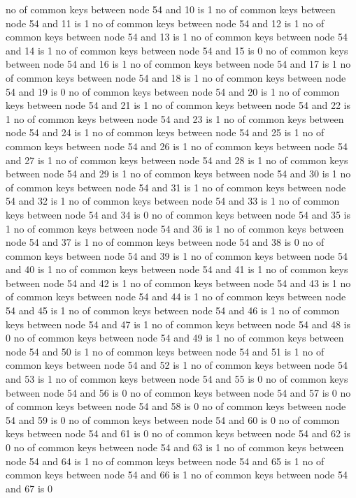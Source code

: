 no of common keys between node 54 and 10 is 1
no of common keys between node 54 and 11 is 1
no of common keys between node 54 and 12 is 1
no of common keys between node 54 and 13 is 1
no of common keys between node 54 and 14 is 1
no of common keys between node 54 and 15 is 0
no of common keys between node 54 and 16 is 1
no of common keys between node 54 and 17 is 1
no of common keys between node 54 and 18 is 1
no of common keys between node 54 and 19 is 0
no of common keys between node 54 and 20 is 1
no of common keys between node 54 and 21 is 1
no of common keys between node 54 and 22 is 1
no of common keys between node 54 and 23 is 1
no of common keys between node 54 and 24 is 1
no of common keys between node 54 and 25 is 1
no of common keys between node 54 and 26 is 1
no of common keys between node 54 and 27 is 1
no of common keys between node 54 and 28 is 1
no of common keys between node 54 and 29 is 1
no of common keys between node 54 and 30 is 1
no of common keys between node 54 and 31 is 1
no of common keys between node 54 and 32 is 1
no of common keys between node 54 and 33 is 1
no of common keys between node 54 and 34 is 0
no of common keys between node 54 and 35 is 1
no of common keys between node 54 and 36 is 1
no of common keys between node 54 and 37 is 1
no of common keys between node 54 and 38 is 0
no of common keys between node 54 and 39 is 1
no of common keys between node 54 and 40 is 1
no of common keys between node 54 and 41 is 1
no of common keys between node 54 and 42 is 1
no of common keys between node 54 and 43 is 1
no of common keys between node 54 and 44 is 1
no of common keys between node 54 and 45 is 1
no of common keys between node 54 and 46 is 1
no of common keys between node 54 and 47 is 1
no of common keys between node 54 and 48 is 0
no of common keys between node 54 and 49 is 1
no of common keys between node 54 and 50 is 1
no of common keys between node 54 and 51 is 1
no of common keys between node 54 and 52 is 1
no of common keys between node 54 and 53 is 1
no of common keys between node 54 and 55 is 0
no of common keys between node 54 and 56 is 0
no of common keys between node 54 and 57 is 0
no of common keys between node 54 and 58 is 0
no of common keys between node 54 and 59 is 0
no of common keys between node 54 and 60 is 0
no of common keys between node 54 and 61 is 0
no of common keys between node 54 and 62 is 0
no of common keys between node 54 and 63 is 1
no of common keys between node 54 and 64 is 1
no of common keys between node 54 and 65 is 1
no of common keys between node 54 and 66 is 1
no of common keys between node 54 and 67 is 0
